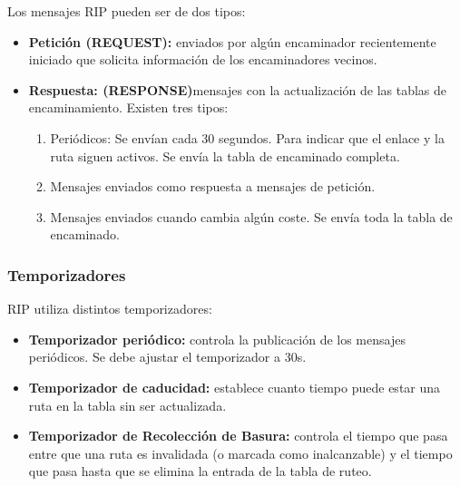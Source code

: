 \begin{onepage}
    Los mensajes RIP pueden ser de dos tipos:
    \begin{itemize}
        \item \textbf{Petición (REQUEST): }enviados por algún encaminador recientemente iniciado que solicita información de los encaminadores vecinos.
        \item \textbf{Respuesta: (RESPONSE)}mensajes con la actualización de las tablas de encaminamiento. Existen tres tipos:
        \begin{enumerate}
            \item Periódicos: Se envían cada 30 segundos. Para indicar que el enlace y la ruta siguen activos. Se envía la tabla de encaminado completa.
            \item Mensajes enviados como respuesta a mensajes de petición.
            \item Mensajes enviados cuando cambia algún coste. Se envía toda la tabla de encaminado.
        \end{enumerate}
    \end{itemize}
    \end{onepage}
    \subsubsection{Temporizadores}
    RIP utiliza distintos temporizadores:
    \begin{itemize}
        \item \textbf{Temporizador periódico: }controla la publicación de los mensajes periódicos. Se debe ajustar el temporizador a 30s.
        \item \textbf{Temporizador de caducidad: }establece cuanto tiempo puede estar una ruta en la tabla sin ser actualizada.
        \item \textbf{Temporizador de Recolección de Basura: }controla el tiempo que pasa entre que una ruta es invalidada (o marcada como inalcanzable) y el tiempo que pasa hasta que se elimina la entrada de la tabla de ruteo.
    \end{itemize}

